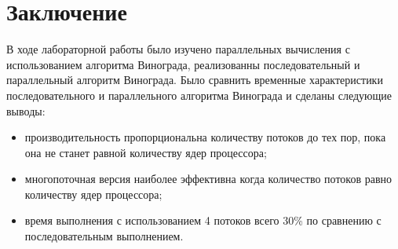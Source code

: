 \chapter*{Заключение}

В ходе лабораторной работы было изучено параллельных вычисления
с использованием алгоритма Винограда, реализованны
последовательный и параллельный алгоритм Винограда.
Было сравнить временные характеристики последовательного и параллельного алгоритма Винограда
и сделаны следующие выводы:

\begin{itemize}
    \item производительность пропорциональна количеству потоков до тех пор,
    пока она не станет равной количеству ядер процессора;
    \item многопоточная версия наиболее эффективна когда количество потоков равно количеству ядер процессора;
    \item время выполнения с использованием 4 потоков всего 30\% по сравнению с последовательным выполнением.
\end{itemize}
